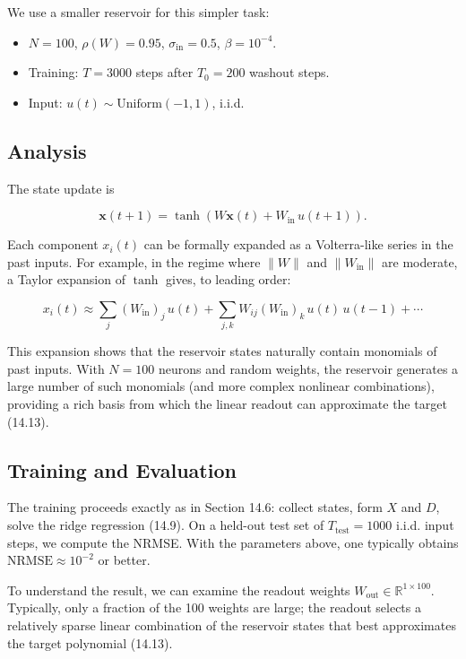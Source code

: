 We use a smaller reservoir for this simpler task:

\begin{itemize}[nosep]
  \item $N = 100$, $\rho(W) = 0.95$, $\sigma_{\text{in}} = 0.5$, $\beta = 10^{-4}$.
  \item Training: $T = 3000$ steps after $T_0 = 200$ washout steps.
  \item Input: $u(t) \sim \text{Uniform}(-1, 1)$, i.i.d.
\end{itemize}

\subsection{Analysis}\label{sec:14.7.3}

The state update is

\[
\mathbf{x}(t+1) = \tanh(W\mathbf{x}(t) + W_{\text{in}}\, u(t+1)).
\]

Each component $x_i(t)$ can be formally expanded as a Volterra-like series in the past inputs. For example, in the regime where $\|W\|$ and $\|W_{\text{in}}\|$ are moderate, a Taylor expansion of $\tanh$ gives, to leading order:

\[
x_i(t) \approx \sum_{j} (W_{\text{in}})_j\, u(t) + \sum_{j,k} W_{ij} (W_{\text{in}})_k\, u(t)\, u(t-1) + \cdots
\]

This expansion shows that the reservoir states naturally contain monomials of past inputs. With $N = 100$ neurons and random weights, the reservoir generates a large number of such monomials (and more complex nonlinear combinations), providing a rich basis from which the linear readout can approximate the target (14.13).

\subsection{Training and Evaluation}\label{sec:14.7.4}

The training proceeds exactly as in Section 14.6: collect states, form $X$ and $D$, solve the ridge regression (14.9). On a held-out test set of $T_{\text{test}} = 1000$ i.i.d. input steps, we compute the NRMSE. With the parameters above, one typically obtains $\text{NRMSE} \approx 10^{-2}$ or better.

To understand the result, we can examine the readout weights $W_{\text{out}} \in \mathbb{R}^{1 \times 100}$. Typically, only a fraction of the 100 weights are large; the readout selects a relatively sparse linear combination of the reservoir states that best approximates the target polynomial (14.13).

